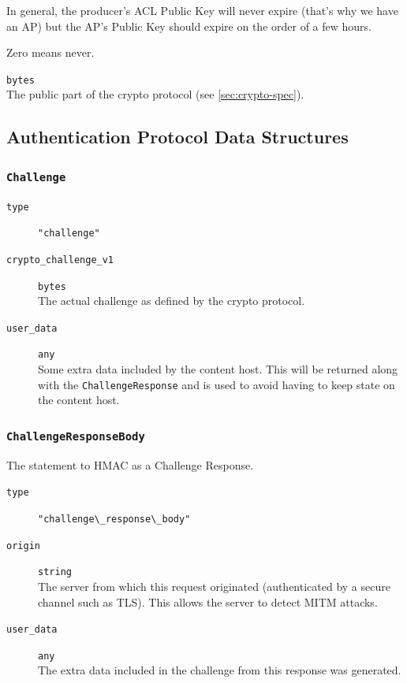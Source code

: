 \documentclass[pdftex,12pt,a4papaer,twoside,notitlepage]{report}
\begin{document}
\begin{appendices}
\begin{leftbar}
\begin{description}[labelindent=2em,leftmargin=3em]
  In general, the producer's ACL Public Key will never expire (that's why we
  have an AP) but the AP's Public Key should expire on the order of a few
  hours.
  
  Zero means never.

\item[\texttt{public\_v1}] \texttt{bytes} \\
  The public part of the crypto protocol (see \cref{sec:crypto-spec}).
\end{description}
\end{leftbar}

\subsection{Authentication Protocol Data Structures}

\subsubsection{\texttt{Challenge}}

\begin{leftbar}
\begin{description}
\item[\texttt{type}] \verb="challenge"=
\item[\texttt{crypto\_challenge\_v1}] \texttt{bytes} \\
  The actual challenge as defined by the crypto protocol.
\item[\texttt{user\_data}] \texttt{any} \\
  Some extra data included by the content host. This will be returned along with
  the \texttt{ChallengeResponse} and is used to avoid having to keep state on
  the content host.
\end{description}
\end{leftbar}

\subsubsection{\texttt{ChallengeResponseBody}}
\label{struct:challenge_response_body}

The statement to HMAC as a Challenge Response.

\begin{leftbar}
\begin{description}
\item[\texttt{type}] \verb="challenge\_response\_body"=
\item[\texttt{origin}] \texttt{string} \\
  The server from which this request originated (authenticated by a secure
  channel such as TLS). This allows the server to detect MITM attacks.
\item[\texttt{user\_data}] \texttt{any} \\
  The extra data included in the challenge from this response was generated.
\end{description}
\end{leftbar}


\end{appendices}
\end{document}
